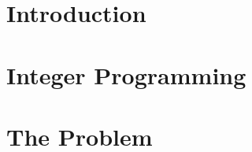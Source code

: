 \documentclass[12pt,a4paper]{report}
\begin{document}



\tableofcontents
\thispagestyle{empty}

\chapter{Introduction}


\chapter{Integer Programming}


\chapter{The Problem}




\end{document}
